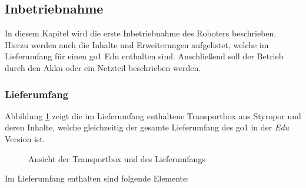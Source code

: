 \subsection{Inbetriebnahme}
\label{subsec:inbetriebnahme}

In diesem Kapitel wird die erste Inbetriebnahme des Roboters beschrieben.
Hierzu werden auch die Inhalte und Erweiterungen aufgelistet, welche im Lieferumfang für einen \gls{go1} Edu enthalten sind.
Anschließend soll der Betrieb durch den Akku oder ein Netzteil beschrieben werden.

\subsubsection{Lieferumfang}

Abbildung \ref{fig:lieferumfang} zeigt die im Lieferumfang enthaltene Transportbox aus Styropor und deren Inhalte, welche
gleichzeitig der gesamte Lieferumfang des \gls{go1} in der \emph{Edu} Version ist.

\begin{figure}[h]
    \caption{Ansicht der Transportbox und des Lieferumfangs}\label{fig:lieferumfang}
\end{figure}

\noindent Im Lieferumfang enthalten sind folgende Elemente:

